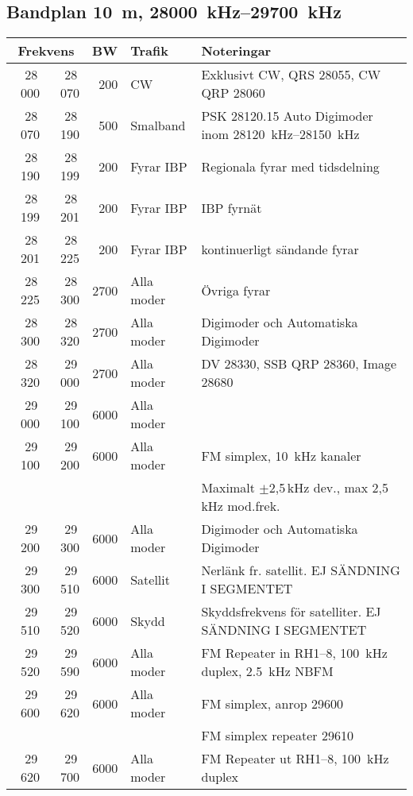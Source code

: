 \subsection{Bandplan \qty{10}{\metre}, \SIrange{28000}{29700}{\kilo\hertz}}
\begin{tabular}{rrrll}
\multicolumn{2}{c}{\textbf{Frekvens}} & \textbf{BW} & \textbf{Trafik} & \textbf{Noteringar} \\ \hline

28\,000 & 28\,070 & 200  & CW         & Exklusivt CW, QRS \num{28055}, CW QRP \num{28060}                  \\ \hline
28\,070 & 28\,190 & 500  & Smalband   & PSK \num{28120,15} Auto Digimoder inom \SIrange{28120}{28150}{\kilo\hertz} \\ \hline
28\,190 & 28\,199 & 200  & Fyrar IBP  & Regionala fyrar med tidsdelning                                    \\ \hline
28\,199 & 28\,201 & 200  & Fyrar IBP  & IBP fyrnät                                                         \\ \hline
28\,201 & 28\,225 & 200  & Fyrar IBP  & kontinuerligt sändande fyrar                                       \\ \hline
28\,225 & 28\,300 & 2700 & Alla moder & Övriga fyrar                                                       \\ \hline
28\,300 & 28\,320 & 2700 & Alla moder & Digimoder och Automatiska Digimoder                                \\ \hline
28\,320 & 29\,000 & 2700 & Alla moder & DV \num{28330}, SSB QRP \num{28360}, Image \num{28680}             \\ \hline
29\,000 & 29\,100 & 6000 & Alla moder &                                                                    \\ \hline
29\,100 & 29\,200 & 6000 & Alla moder & FM simplex, \qty{10}{\kilo\hertz} kanaler                          \\
        &         &      &            & Maximalt $\pm$2,5\,kHz dev., max 2,5\,kHz mod.frek.                \\ \hline
29\,200 & 29\,300 & 6000 & Alla moder & Digimoder och Automatiska Digimoder                                \\ \hline
29\,300 & 29\,510 & 6000 & Satellit   & Nerlänk fr. satellit. EJ SÄNDNING I SEGMENTET                      \\ \hline
29\,510 & 29\,520 & 6000 & Skydd      & Skyddsfrekvens för satelliter. EJ SÄNDNING I SEGMENTET             \\ \hline
29\,520 & 29\,590 & 6000 & Alla moder & FM Repeater in RH1--8, \qty{100}{\kilo\hertz} duplex, \qty{2,5}{\kilo\hertz} NBFM    \\ \hline
29\,600 & 29\,620 & 6000 & Alla moder & FM simplex, anrop \num{29600}                                      \\
        &         &      &            & FM simplex repeater \num{29610}                                    \\ \hline
29\,620 & 29\,700 & 6000 & Alla moder & FM Repeater ut RH1--8, \qty{100}{\kilo\hertz} duplex                       \\
\end{tabular}
